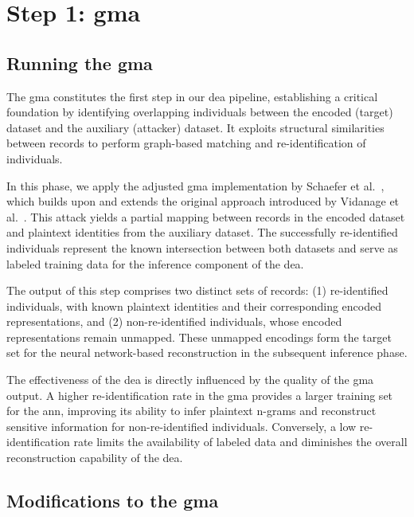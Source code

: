 \section{Step 1: \ac{gma}} \label{sec:deagma}

\subsection{Running the \ac{gma}} \label{sec:runninggma}

The \ac{gma} constitutes the first step in our \ac{dea} pipeline, establishing a critical foundation by identifying overlapping individuals between the encoded (target) dataset and the auxiliary (attacker) dataset.
It exploits structural similarities between records to perform graph-based matching and re-identification of individuals.

In this phase, we apply the adjusted \ac{gma} implementation by Schaefer et al.~\cite{schaefer2024}, which builds upon and extends the original approach introduced by Vidanage et al.~\cite{vidanage2020graph}.
This attack yields a partial mapping between records in the encoded dataset and plaintext identities from the auxiliary dataset.
The successfully re-identified individuals represent the known intersection between both datasets and serve as labeled training data for the inference component of the \ac{dea}.

The output of this step comprises two distinct sets of records:
(1) re-identified individuals, with known plaintext identities and their corresponding encoded representations, and
(2) non-re-identified individuals, whose encoded representations remain unmapped.
These unmapped encodings form the target set for the neural network-based reconstruction in the subsequent inference phase.

The effectiveness of the \ac{dea} is directly influenced by the quality of the \ac{gma} output.
A higher re-identification rate in the \ac{gma} provides a larger training set for the \ac{ann}, improving its ability to infer plaintext n-grams and reconstruct sensitive information for non-re-identified individuals.
Conversely, a low re-identification rate limits the availability of labeled data and diminishes the overall reconstruction capability of the \ac{dea}.

\subsection{Modifications to the \ac{gma}} \label{sec:modificationstogma}

